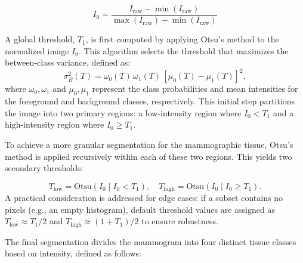 \documentclass[runningheads]{llncs}
\begin{document}
\begin{equation}
I_0 = \frac{I_{\text{raw}} - \min(I_{\text{raw}})}{\max(I_{\text{raw}}) - \min(I_{\text{raw}})}
\label{eq:normalization}
\end{equation}

A global threshold, \( T_1 \), is first computed by applying Otsu's
method to the normalized image \( I_0 \). This algorithm selects the
threshold that maximizes the between-class variance, defined as:
\begin{equation}
\sigma_B^2(T) = \omega_0(T)\,\omega_1(T)\,[\mu_0(T) - \mu_1(T)]^2,
\label{eq:between_class_var}
\end{equation}
where \( \omega_0, \omega_1 \) and \( \mu_0, \mu_1 \) represent the
class probabilities and mean intensities for the foreground and
background classes, respectively. This initial step partitions the
image into two primary regions: a low-intensity region where
\( I_0 < T_1 \) and a high-intensity region where
\( I_0 \geq T_1 \).

To achieve a more granular segmentation for the  mammographic
tissue, Otsu's method is applied recursively within
each of these two regions. This yields two secondary thresholds:


\begin{equation}
T_{\text{low}} = \text{Otsu}(I_0 \mid I_0 < T_1), \quad T_{\text{high}} = \text{Otsu}(I_0 \mid I_0 \geq T_1).
\label{eq:secondary_thresholds}
\end{equation}
A practical consideration is addressed for edge cases: if a subset
contains no pixels (e.g., an empty histogram), default threshold
values are assigned as \( T_{\text{low}} \approx T_1/2 \) and
\( T_{\text{high}} \approx (1+T_1)/2 \) to ensure robustness.

The final segmentation divides the mammogram into four distinct tissue
classes based on intensity, defined as follows:
\end{document}
